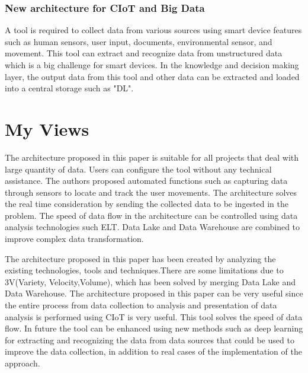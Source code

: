 \documentclass{article}
\begin{document}
\subsubsection{New architecture for CIoT and Big Data}
A tool is required to collect data from various sources using smart device features such as human sensors, user input, documents, environmental sensor, and movement. This tool can extract and recognize data from unstructured data which is a big challenge for smart devices. In the knowledge and decision making layer, the output data from this tool and other data can be extracted and loaded into a central storage such as "DL".
\section{My Views}
The architecture proposed in this paper is suitable for all projects that deal with large quantity of data. Users can configure the tool without any technical assistance. The authors proposed automated functions such as capturing data through sensors to locate and track the user movements. The architecture solves the real time consideration by sending the collected data to be ingested in the problem. The speed of data flow in the architecture can be controlled using data analysis technologies such ELT. Data Lake and Data Warehouse are combined to improve complex data transformation.

The architecture proposed in this paper has been created by analyzing the existing technologies, tools and techniques.There are some limitations due to 3V(Variety, Velocity,Volume), which has been solved by merging Data Lake and Data Warehouse. The architecture proposed in this paper can be very useful since the entire process from data collection to analysis and presentation of data analysis is performed using CIoT is very useful. This tool solves the speed of data flow. In future the tool can be enhanced using new methods such as deep learning for extracting and recognizing the data from data sources that could be used to improve the data collection, in addition to real cases of the implementation of the approach.
\end{document}
